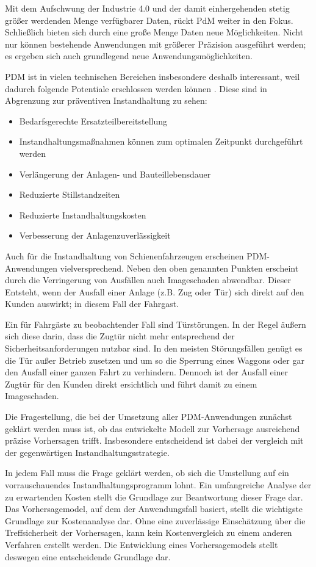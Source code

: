 Mit dem Aufschwung der Industrie 4.0 und der damit einhergehenden stetig größer werdenden Menge verfügbarer Daten, rückt PdM weiter in den Fokus. Schließlich bieten sich durch eine große Menge Daten neue Möglichkeiten. Nicht nur können bestehende Anwendungen mit größerer Präzision ausgeführt werden; es ergeben sich auch grundlegend neue Anwendungsmöglichkeiten.

PDM ist in vielen technischen Bereichen insbesondere deshalb interessant, weil  dadurch folgende Potentiale erschlossen werden können \cite[S.~31]{Holzel.2019}. Diese sind in Abgrenzung zur präventiven Instandhaltung zu sehen:
\begin{itemize}
	\item Bedarfsgerechte Ersatzteilbereitstellung
	\item Instandhaltungsmaßnahmen können zum optimalen Zeitpunkt durchgeführt werden
	\item Verlängerung der Anlagen- und Bauteillebensdauer
	\item Reduzierte Stillstandzeiten
	\item Reduzierte Instandhaltungskosten
	\item Verbesserung der Anlagenzuverlässigkeit
\end{itemize}

Auch für die Instandhaltung von Schienenfahrzeugen erscheinen PDM-Anwendungen vielversprechend. Neben den oben genannten Punkten erscheint durch die Verringerung von Ausfällen auch Imageschaden abwendbar. Dieser Entsteht, wenn  der Ausfall einer Anlage (z.B. Zug oder Tür) sich direkt auf den Kunden auswirkt; in diesem Fall der Fahrgast.

Ein für Fahrgäste zu beobachtender Fall sind Türstörungen. In der Regel äußern sich diese darin, dass die Zugtür nicht mehr entsprechend der Sicherheitsanforderungen nutzbar sind. In den meisten Störungsfällen genügt es die Tür außer Betrieb zusetzen und um so die Sperrung eines Waggons oder gar den Ausfall einer ganzen Fahrt zu verhindern. Dennoch ist der Ausfall einer Zugtür für den Kunden direkt ersichtlich und führt damit zu einem Imageschaden.

Die Fragestellung, die bei der Umsetzung aller PDM-Anwendungen zunächst geklärt werden muss ist, ob das entwickelte Modell zur Vorhersage ausreichend präzise Vorhersagen trifft. Insbesondere entscheidend ist dabei der vergleich mit der gegenwärtigen Instandhaltungsstrategie.

In jedem Fall muss die Frage geklärt werden, ob sich die Umstellung auf ein vorrauschauendes Instandhaltungsprogramm lohnt. Ein umfangreiche Analyse der zu erwartenden Kosten stellt die Grundlage zur Beantwortung dieser Frage dar. Das Vorhersagemodel, auf dem der Anwendungsfall basiert, stellt die wichtigste Grundlage zur Kostenanalyse dar. Ohne eine zuverlässige Einschätzung über die Treffsicherheit der Vorhersagen, kann kein Kostenvergleich zu einem anderen Verfahren erstellt werden. Die Entwicklung eines Vorhersagemodels stellt deswegen eine entscheidende Grundlage dar. 

